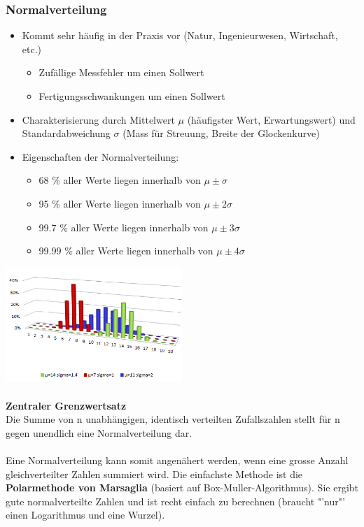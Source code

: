 \subsubsection{Normalverteilung}
\begin{itemize}
    \item Kommt sehr häufig in der Praxis vor (Natur, Ingenieurwesen, Wirtschaft, etc.)
        \begin{itemize}
            \item Zufällige Messfehler um einen Sollwert
            \item Fertigungsschwankungen um einen Sollwert
        \end{itemize}
    \item Charakterisierung durch Mittelwert $\mu$ (häufigster Wert, Erwartungswert) und Standardabweichung $\sigma$  (Mass für Streuung, Breite der Glockenkurve)
    \item Eigenschaften der Normalverteilung:
        \begin{itemize}
            \item 68 \% aller Werte liegen innerhalb von $\mu \pm \sigma$
            \item 95 \% aller Werte liegen innerhalb von $\mu \pm 2\sigma$
            \item 99.7 \% aller Werte liegen innerhalb von $\mu \pm 3\sigma$
            \item 99.99 \% aller Werte liegen innerhalb von $\mu \pm 4\sigma$
        \end{itemize}
    \end{itemize}
\includegraphics[width=0.5\textwidth]{images/Simulation/Normalverteilung.png}\\\\
\textbf{Zentraler Grenzwertsatz}\\
Die Summe von n unabhängigen, identisch verteilten Zufallszahlen stellt für n gegen unendlich eine Normalverteilung dar. \\\\ Eine Normalverteilung kann somit angenähert werden, wenn eine grosse Anzahl gleichverteilter Zahlen summiert wird. Die einfachste Methode ist die \textbf{Polarmethode von Marsaglia} (basiert auf Box-Muller-Algorithmus). Sie ergibt gute normalverteilte Zahlen und ist recht einfach zu berechnen (braucht "'nur"' einen Logarithmus und eine Wurzel).



